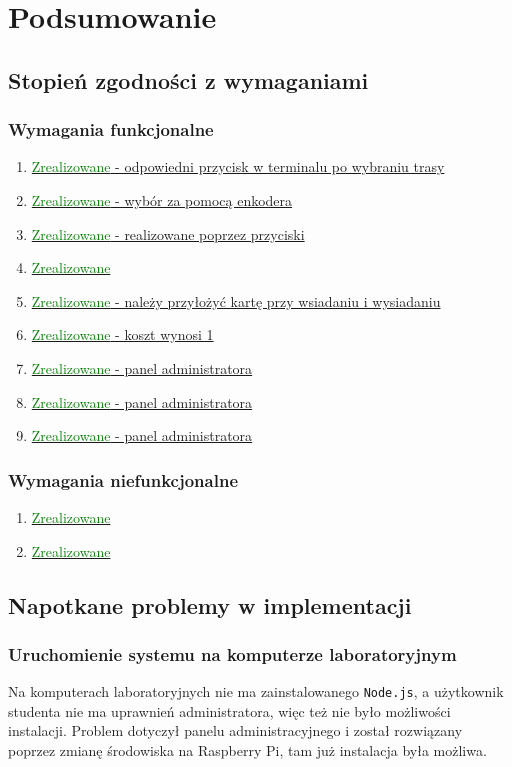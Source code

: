 \section{Podsumowanie}
\subsection{Stopień zgodności z wymaganiami}
\subsubsection{Wymagania funkcjonalne}
\begin{enumerate}
  \item{\hyperref[func_1]{\textcolor{green}{Zrealizowane} - odpowiedni przycisk w terminalu po wybraniu trasy}}
  \item{\hyperref[func_2]{\textcolor{green}{Zrealizowane} - wybór za pomocą enkodera}}
  \item{\hyperref[func_3]{\textcolor{green}{Zrealizowane} - realizowane poprzez przyciski}}
  \item{\hyperref[func_4]{\textcolor{green}{Zrealizowane}}}
  \item{\hyperref[func_5]{\textcolor{green}{Zrealizowane} - należy przyłożyć kartę przy wsiadaniu i wysiadaniu}}
  \item{\hyperref[func_6]{\textcolor{green}{Zrealizowane} - koszt wynosi 1}}
  \item{\hyperref[func_7]{\textcolor{green}{Zrealizowane} - panel administratora}}
  \item{\hyperref[func_8]{\textcolor{green}{Zrealizowane} - panel administratora}}
  \item{\hyperref[func_9]{\textcolor{green}{Zrealizowane} - panel administratora}}
\end{enumerate}
\subsubsection{Wymagania niefunkcjonalne}
\begin{enumerate}
  \item{\hyperref[nfunc_1]{\textcolor{green}{Zrealizowane}}}
  \item{\hyperref[nfunc_2]{\textcolor{green}{Zrealizowane}}}
\end{enumerate}
\subsection{Napotkane problemy w implementacji}
\subsubsection{Uruchomienie systemu na komputerze laboratoryjnym}
Na komputerach laboratoryjnych nie ma zainstalowanego \verb|Node.js|, a użytkownik studenta nie ma uprawnień administratora, więc też nie było możliwości instalacji. Problem dotyczył panelu administracyjnego i został rozwiązany poprzez zmianę środowiska na Raspberry Pi, tam już instalacja była możliwa.
